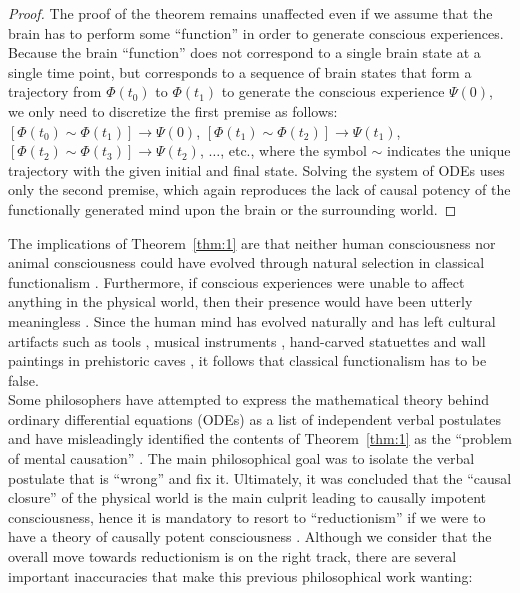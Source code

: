 \documentclass{ws-ijmpb}
\begin{document}
\begin{proof}
The proof of the theorem remains unaffected even if we assume that
the brain has to perform some ``function'' in order to generate
conscious experiences. Because the brain ``function'' does
not correspond to a single brain state at a single time point, but
corresponds to a sequence of brain states that form a trajectory from
$\Phi(t_{0})$ to $\Phi(t_{1})$ to generate the conscious experience
$\Psi(0)$, we only need to discretize the first premise as follows:
$[\Phi(t_{0})\sim\Phi(t_{1})]\rightarrow\Psi(0)$,
$[\Phi(t_{1})\sim\Phi(t_{2})]\rightarrow\Psi(t_1)$,
$[\Phi(t_{2})\sim\Phi(t_{3})]\rightarrow\Psi(t_2)$, $\ldots$, etc.,
where the symbol $\sim$ indicates the unique trajectory with the
given initial and final state. Solving the system of ODEs uses only
the second premise, which again reproduces the lack of causal potency
of the functionally generated mind upon the brain or the surrounding
world.
\end{proof}

The implications of Theorem~\ref{thm:1} are that neither human consciousness nor animal consciousness could have evolved through natural selection in classical functionalism \cite{Georgiev2017}.
Furthermore, if conscious experiences were unable to affect anything in the physical world, then their presence would have been utterly
meaningless \cite{James1879}. Since the human mind has evolved naturally and has left
cultural artifacts such as tools \cite{Zupancich2016}, musical instruments \cite{Conard2009b}, hand-carved
statuettes \cite{Conard2009a} and wall paintings in prehistoric caves \cite{Burkitt1921,Chauvet1996,Chauvet2001,Aubert2014,Hoffmann2018,Pike2012,Lewis2002,Lewis2003,Gross2020}, it follows that classical functionalism has to be false.\\

Some philosophers have attempted to express the mathematical theory
behind ordinary differential equations (ODEs) as a list of independent
verbal postulates and have misleadingly identified the contents of
Theorem~\ref{thm:1} as the ``problem of mental causation''
\cite{Kim1997,Kim1998}. The main philosophical goal was to isolate
the verbal postulate that is ``wrong'' and fix it. Ultimately,
it was concluded that the ``causal closure'' of the physical
world is the main culprit leading to causally impotent consciousness,
hence it is mandatory to resort to ``reductionism'' if we
were to have a theory of causally potent consciousness \cite{Kim2003}.
Although we consider that the overall move towards reductionism is
on the right track, there are several important inaccuracies that
make this previous philosophical work wanting:
\end{document}
